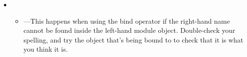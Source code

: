 \documentclass{handout}
\begin{document}
\begin{itemize}
\item {}

\begin{itemize}
  \item {}---This happens when using the bind operator if the right-hand name cannot be found inside the left-hand module object. Double-check your spelling, and try  the object that's being bound to to check that it is what you think it is.
\end{itemize}


\end{itemize}
\end{document}
